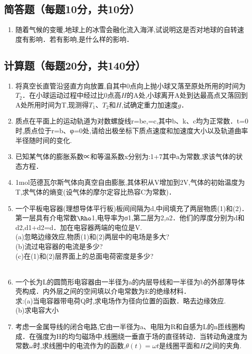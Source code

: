 
\subsection{简答题（每题10分，共10分）}
\begin{enumerate}
\item 随着气候的变暖,地球上的冰雪会融化流入海洋,试说明这是否对地球的自转速度有影响．若有影响,是什么样的影响．
\end{enumerate}
\subsection{计算题（每题20分，共140分）}
\begin{enumerate}
\item 将真空长直管沿竖直方向放置,自其中0点向上抛小球又落至原处所用的时间为$T_2$．在小球运动过程中经过比0点高$H$的$\mathrm A$处,小球离开$\mathrm A$处到达最高点又落回到$\mathrm A$处所用时间为T,现测得$T_1$、$T_2$和$H$,试确定重力加速度$g$．
\item 质点在平面上的运动轨道为对数螺旋线r=be,=c,其中b、k、c均为正常数．t=0时,质点位于r=b、φ=0处,请给出极坐标下质点速度和加速度大小以及轨道曲率半径随时间的变化.
\item 已知某气体的膨胀系数∝和等温系数x分别为:1+7其中a为常数,求该气体的状态方程．
\item 1mol范德瓦尔斯气体向真空自由膨胀,其体积从V增加到2V,气体的初始温度为T,求气体的熵变(设气体的摩尔定容比热容C为常数)．
\item 一个平板电容器(理想导体平行板)板间间隔为d,中间填充了两层物质(1)和(2)．第一层具有介电常数$\Rho $1,电导率为σ1,第二层为2,a2．他们的厚度分别为d和d2,d1+d2=d．加在电容器两端的电位是V.\\
(a)忽略边缘效应,物质(1)和(2)两层中的电场是多大?\\
(b)流过电容器的电流是多少?\\
(c)在(1)和(2)层界面上的总面电荷密度是多少?\\
\\
\item 一个长为L的圆筒形电容器由一半径为a的内层导线和一半径为b的外部薄导体壳构成．内外层之间的空间填以介电常数为E的绝缘材料．\\
求:(a)当电容器带电荷Q时,求电场作为径向位置的函数．略去边缘效应.\\
(b)求电容大小
\item 考虑一金属导线的闭合电路,它由一半径为a、电阻为R和自感为L的n匝线圈构成．在强度为H的均匀磁场中,线圈绕一垂直于场的直径转动．当转动角速度为常数$\omega$时,求线圈中的电流作为的函数,$\theta (t)=\omega t$是线圈平面和$H$之间的夹角.

\end{enumerate}